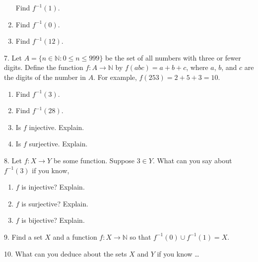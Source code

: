 \documentclass[10pt,]{book}
\theoremstyle{plain}
\theoremstyle{definition}
\theoremstyle{definition}
\theoremstyle{definition}
\numberwithin{equation}{chapter}
\def\N{\mathbb N}
\def\inv{^{-1}}
\def\st{:}
\begin{document}
\begin{exerciselist}
\begin{enumerate}[label=(\alph*)]
                Find \(f\inv(1)\).
\item\hypertarget{li-324}{}
                Find \(f\inv(0)\).
\item\hypertarget{li-325}{}
                Find \(f\inv(12)\).
\end{enumerate}
\par\smallskip
\item[7.]\hypertarget{exercise-33}{}
            Let \(A = \{n \in \N \st 0 \le n \le 999\}\) be the set of all numbers with three or fewer digits. Define the function \(f:A \to \N\) by \(f(abc) = a+b+c\), where \(a\), \(b\), and \(c\) are the digits of the number in \(A\). For example, \(f(253) = 2 + 5 + 3 =  10\).
\leavevmode%
\begin{enumerate}[label=(\alph*)]
\item\hypertarget{li-331}{}
                Find \(f\inv(3)\).
\item\hypertarget{li-332}{}
                Find \(f\inv(28)\).
\item\hypertarget{li-333}{}
                Is \(f\) injective. Explain.
\item\hypertarget{li-334}{}
                Is \(f\) surjective. Explain.
\end{enumerate}
\par\smallskip
\item[8.]\hypertarget{exercise-34}{}
            Let \(f:X \to Y\) be some function. Suppose \(3 \in Y\). What can you say about \(f\inv(3)\) if you know,
\leavevmode%
\begin{enumerate}[label=(\alph*)]
\item\hypertarget{li-339}{}\(f\) is injective? Explain.%
\item\hypertarget{li-340}{}\(f\) is surjective? Explain.%
\item\hypertarget{li-341}{}\(f\) is bijective? Explain.%
\end{enumerate}
\par\smallskip
\item[9.]\hypertarget{exercise-35}{}
            Find a set \(X\) and a function \(f:X \to \N\) so that \(f\inv(0) \cup f\inv(1) = X\).
\par\smallskip
\item[10.]\hypertarget{exercise-36}{}
            What can you deduce about the sets \(X\) and \(Y\) if you know
            \dots{}
\leavevmode%

\end{exerciselist}
\end{document}
